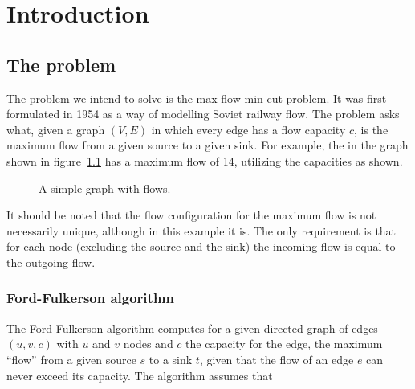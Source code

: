\chapter{Introduction}

\section{The problem}

The problem we intend to solve is the max flow min cut problem. It was first formulated in 1954 as a way of modelling Soviet railway flow\cite{HarrisRoss}. The problem asks what, given a graph $(V,E)$ in which every edge has a flow capacity $c$, is the maximum flow from a given source to a given sink. For example, the in the graph shown in figure~\ref{fig:simple-graph} has a maximum flow of 14, utilizing the capacities as shown.

\begin{figure}[h]
\centering
{}
\caption{A simple graph with flows.}
\label{fig:simple-graph}
\end{figure}

It should be noted that the flow configuration for the maximum flow is not necessarily unique, although in this example it is. The only requirement is that for each node (excluding the source and the sink) the incoming flow is equal to the outgoing flow.

\subsection{Ford-Fulkerson algorithm}

The Ford-Fulkerson algorithm computes for a given directed graph of edges $(u, v, c)$ with $u$ and $v$ nodes and $c$ the capacity for the edge, the maximum ``flow'' from a given source $s$ to a sink $t$, given that the flow of an edge $e$ can never exceed its capacity. The algorithm assumes that

